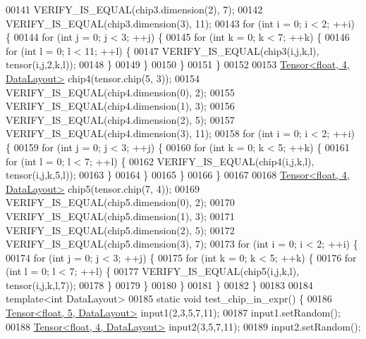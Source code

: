 \begin{DoxyCode}
00141   VERIFY\_IS\_EQUAL(chip3.dimension(2), 7);
00142   VERIFY\_IS\_EQUAL(chip3.dimension(3), 11);
00143   \textcolor{keywordflow}{for} (\textcolor{keywordtype}{int} i = 0; i < 2; ++i) \{
00144     \textcolor{keywordflow}{for} (\textcolor{keywordtype}{int} j = 0; j < 3; ++j) \{
00145       \textcolor{keywordflow}{for} (\textcolor{keywordtype}{int} k = 0; k < 7; ++k) \{
00146         \textcolor{keywordflow}{for} (\textcolor{keywordtype}{int} l = 0; l < 11; ++l) \{
00147           VERIFY\_IS\_EQUAL(chip3(i,j,k,l), tensor(i,j,2,k,l));
00148         \}
00149       \}
00150     \}
00151   \}
00152 
00153   \hyperlink{class_eigen_1_1_tensor}{Tensor<float, 4, DataLayout>} chip4(tensor.chip(5, 3));
00154   VERIFY\_IS\_EQUAL(chip4.dimension(0), 2);
00155   VERIFY\_IS\_EQUAL(chip4.dimension(1), 3);
00156   VERIFY\_IS\_EQUAL(chip4.dimension(2), 5);
00157   VERIFY\_IS\_EQUAL(chip4.dimension(3), 11);
00158   \textcolor{keywordflow}{for} (\textcolor{keywordtype}{int} i = 0; i < 2; ++i) \{
00159     \textcolor{keywordflow}{for} (\textcolor{keywordtype}{int} j = 0; j < 3; ++j) \{
00160       \textcolor{keywordflow}{for} (\textcolor{keywordtype}{int} k = 0; k < 5; ++k) \{
00161         \textcolor{keywordflow}{for} (\textcolor{keywordtype}{int} l = 0; l < 7; ++l) \{
00162           VERIFY\_IS\_EQUAL(chip4(i,j,k,l), tensor(i,j,k,5,l));
00163         \}
00164       \}
00165     \}
00166   \}
00167 
00168   \hyperlink{class_eigen_1_1_tensor}{Tensor<float, 4, DataLayout>} chip5(tensor.chip(7, 4));
00169   VERIFY\_IS\_EQUAL(chip5.dimension(0), 2);
00170   VERIFY\_IS\_EQUAL(chip5.dimension(1), 3);
00171   VERIFY\_IS\_EQUAL(chip5.dimension(2), 5);
00172   VERIFY\_IS\_EQUAL(chip5.dimension(3), 7);
00173   \textcolor{keywordflow}{for} (\textcolor{keywordtype}{int} i = 0; i < 2; ++i) \{
00174     \textcolor{keywordflow}{for} (\textcolor{keywordtype}{int} j = 0; j < 3; ++j) \{
00175       \textcolor{keywordflow}{for} (\textcolor{keywordtype}{int} k = 0; k < 5; ++k) \{
00176         \textcolor{keywordflow}{for} (\textcolor{keywordtype}{int} l = 0; l < 7; ++l) \{
00177           VERIFY\_IS\_EQUAL(chip5(i,j,k,l), tensor(i,j,k,l,7));
00178         \}
00179       \}
00180     \}
00181   \}
00182 \}
00183 
00184 \textcolor{keyword}{template}<\textcolor{keywordtype}{int} DataLayout>
00185 \textcolor{keyword}{static} \textcolor{keywordtype}{void} test\_chip\_in\_expr() \{
00186   \hyperlink{class_eigen_1_1_tensor}{Tensor<float, 5, DataLayout>} input1(2,3,5,7,11);
00187   input1.setRandom();
00188   \hyperlink{class_eigen_1_1_tensor}{Tensor<float, 4, DataLayout>} input2(3,5,7,11);
00189   input2.setRandom();

\end{DoxyCode}

